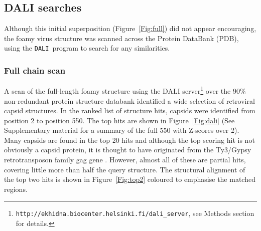 \documentclass[preprint,12pt]{elsarticle}
\newcommand{\DALI}{{\tt DALI}}
\newcommand{\Fig}[1]{Figure~\ref{Fig:#1}}
\begin{document}
\subsection{DALI searches}

Although this initial superposition (\Fig{full}) did not appear encouraging, the foamy virus structure
was scanned across the Protein DataBank (PDB), using the \DALI\ program \cite{HolmLet93a} to search for any similarities.

\subsubsection{Full chain scan}

A scan of the full-length foamy structure using the DALI server\footnote{
{\tt http://ekhidna.biocenter.helsinki.fi/dali\_server},
see Methods section for details.
}
over the 90\% non-redundant protein structure databank
identified a wide selection of retroviral capsid structures.  In the ranked list of structure hits,
capsids were identified from position 2 to position 550.
The top hits are shown in \Fig{dali} (See Supplementary material for a summary of
the full 550 with Z-scores over 2).    Many capsids are found in the top 20 hits and although the top
scoring hit is not obviously a capsid protein, it is thought to have originated from the Ty3/Gypsy
retrotransposon family gag gene \cite{ZhangWet15}.   However, almost all of these are partial
hits, covering little more than half the query structure.   The structural alignment of the top two hits
is shown in \Fig{top2} coloured to emphasise the matched regions.
\end{document}
